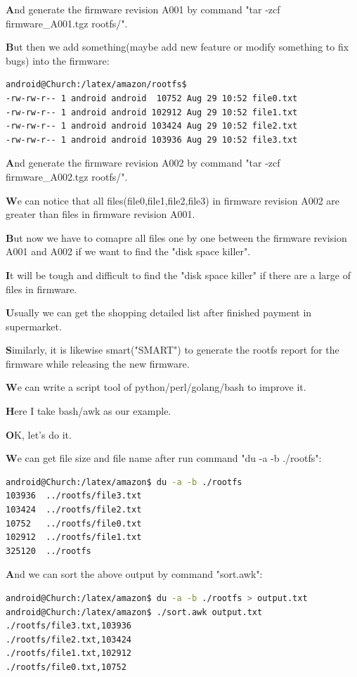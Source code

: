 \documentclass{article}
\begin{document}
\textbf
And generate the firmware revision A001 by command "tar -zcf firmware\_A001.tgz rootfs/".


\textbf
But then we add something(maybe add new feature or modify something to fix bugs) into the firmware:


\begin{lstlisting}[language={bash}]
android@Church:/latex/amazon/rootfs$
-rw-rw-r-- 1 android android  10752 Aug 29 10:52 file0.txt
-rw-rw-r-- 1 android android 102912 Aug 29 10:52 file1.txt
-rw-rw-r-- 1 android android 103424 Aug 29 10:52 file2.txt
-rw-rw-r-- 1 android android 103936 Aug 29 10:52 file3.txt
    \end{lstlisting}

\textbf
And generate the firmware revision A002 by command "tar -zcf firmware\_A002.tgz rootfs/".

\textbf
We can notice that all files(file0,file1,file2,file3) in firmware revision A002 are greater than files in firmware revision A001.

\textbf
But now we have to comapre all files one by one between the firmware revision A001 and A002 if we want to find the "disk space killer".

\textbf
It will be tough and difficult to find the "disk space killer" if there are a large of files in firmware.

\textbf
Usually we can get the shopping detailed list after finished payment in supermarket.

\textbf
Similarly, it is likewise smart("SMART") to generate the rootfs report for the firmware while releasing the new firmware.

\textbf
We can write a script tool of python/perl/golang/bash to improve it.

\textbf
Here I take bash/awk as our example.

\textbf
OK, let's do it.

    
\textbf
We can get file size and file name after run command "du -a -b ./rootfs":

    
\begin{lstlisting}[language={bash}]
android@Church:/latex/amazon$ du -a -b ./rootfs
103936	../rootfs/file3.txt
103424	../rootfs/file2.txt
10752	../rootfs/file0.txt
102912	../rootfs/file1.txt
325120	../rootfs
    \end{lstlisting}

\textbf
And we can sort the above output by command "sort.awk":

\begin{lstlisting}[language={bash}]
android@Church:/latex/amazon$ du -a -b ./rootfs > output.txt
android@Church:/latex/amazon$ ./sort.awk output.txt
./rootfs/file3.txt,103936
./rootfs/file2.txt,103424
./rootfs/file1.txt,102912
./rootfs/file0.txt,10752
    \end{lstlisting}
\end{document}
